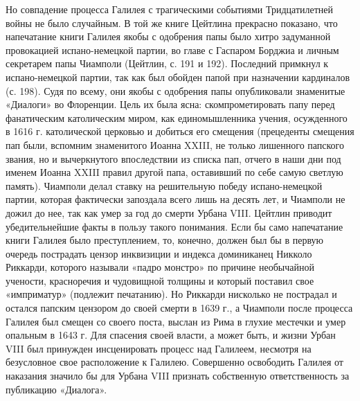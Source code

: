 Но совпадение процесса Галилея с трагическими событиями Тридцатилетней войны не
было случайным. В той же книге Цейтлина прекрасно показано, что напечатание
книги Галилея якобы с одобрения папы было хитро задуманной провокацией
испано-немецкой партии, во главе с Гаспаром Борджиа и личным секретарем папы
Чиамполи (Цейтлин, с. 191 и 192). Последний примкнул к испано-немецкой партии,
так как был обойден папой при назначении кардиналов (с. 198). Судя по всему,
они якобы с одобрения папы опубликовали знаменитые «Диалоги» во Флоренции. Цель
их была ясна: скомпрометировать папу перед фанатическим католическим миром, как
единомышленника учения, осужденного в 1616 г. католической церковью и добиться
его смещения (прецеденты смещения пап были, вспомним знаменитого Иоанна XXIII,
не только лишенного папского звания, но и вычеркнутого впоследствии из списка
пап, отчего в наши дни под именем Иоанна XXIII правил другой папа, оставивший
по себе самую светлую память). Чиамполи делал ставку на решительную победу
испано-немецкой партии, которая фактически запоздала всего лишь на десять лет,
и Чиамполи не дожил до нее, так как умер за год до смерти Урбана VIII.
Цейтлин приводит убедительнейшие факты в пользу такого понимания. Если бы само
напечатание книги Галилея было преступлением, то, конечно, должен был бы в
первую очередь пострадать цензор инквизиции и индекса доминиканец Никколо
Риккарди, которого называли «падро монстро» по причине необычайной учености,
красноречия и чудовищной толщины и который поставил свое «имприматур» (подлежит
печатанию). Но Риккарди нисколько не пострадал и остался папским цензором до
своей смерти в 1639 г., а Чиамполи после процесса Галилея был смещен со своего
поста, выслан из Рима в глухие местечки и умер опальным в 1643 г. Для спасения
своей власти, а может быть, и жизни Урбан VIII был принужден инсценировать
процесс над Галилеем, несмотря на безусловное свое расположение к Галилею.
Совершенно освободить Галилея от наказания значило бы для Урбана VIII признать
собственную ответственность за публикацию «Диалога».

